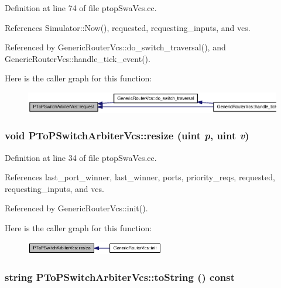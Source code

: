 Definition at line 74 of file ptopSwaVcs.cc.

References Simulator::Now(), requested, requesting\_\-inputs, and vcs.

Referenced by GenericRouterVcs::do\_\-switch\_\-traversal(), and GenericRouterVcs::handle\_\-tick\_\-event().

Here is the caller graph for this function:\nopagebreak
\begin{figure}[H]
\begin{center}
\leavevmode
\includegraphics[width=420pt]{classPToPSwitchArbiterVcs_abe8b9b7e2197d9b9b71648c80fb5489_icgraph}
\end{center}
\end{figure}
\subsubsection[{resize}]{\setlength{\rightskip}{0pt plus 5cm}void PToPSwitchArbiterVcs::resize ({\bf uint} {\em p}, \/  {\bf uint} {\em v})}\label{classPToPSwitchArbiterVcs_f5c5a064d2a62465cd28a5e3e7e61ea0}




Definition at line 34 of file ptopSwaVcs.cc.

References last\_\-port\_\-winner, last\_\-winner, ports, priority\_\-reqs, requested, requesting\_\-inputs, and vcs.

Referenced by GenericRouterVcs::init().

Here is the caller graph for this function:\nopagebreak
\begin{figure}[H]
\begin{center}
\leavevmode
\includegraphics[width=171pt]{classPToPSwitchArbiterVcs_f5c5a064d2a62465cd28a5e3e7e61ea0_icgraph}
\end{center}
\end{figure}
\subsubsection[{toString}]{\setlength{\rightskip}{0pt plus 5cm}string PToPSwitchArbiterVcs::toString () const}\label{classPToPSwitchArbiterVcs_94cdb12d291667d5606a117417c8e339}




